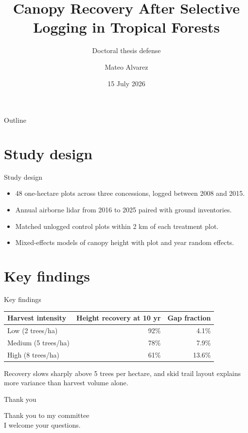 \documentclass[aspectratio=169]{beamer}
\title[Canopy Recovery]{Canopy Recovery After Selective Logging in Tropical Forests}
\subtitle{Doctoral thesis defense}
\author[M. Alvarez]{Mateo Alvarez}
\institute[Halden U.]{Department of Forest Ecology\\Halden University}
\date{15 July 2026}
\begin{document}
\begin{frame}
  \titlepage
\end{frame}

\begin{frame}{Outline}
  \tableofcontents
\end{frame}

\section{Study design}

\begin{frame}{Study design}
  \begin{itemize}
    \item 48 one-hectare plots across three concessions, logged between 2008 and 2015.
    \item Annual airborne lidar from 2016 to 2025 paired with ground inventories.
    \item Matched unlogged control plots within 2 km of each treatment plot.
    \item Mixed-effects models of canopy height with plot and year random effects.
  \end{itemize}
\end{frame}

\section{Key findings}

\begin{frame}{Key findings}
  \begin{table}
    \centering
    \begin{tabular}{lrr}
      \toprule
      Harvest intensity & Height recovery at 10 yr & Gap fraction \\
      \midrule
      Low (2 trees/ha) & 92\% & 4.1\% \\
      Medium (5 trees/ha) & 78\% & 7.9\% \\
      High (8 trees/ha) & 61\% & 13.6\% \\
      \bottomrule
    \end{tabular}
  \end{table}
  \vspace{0.5em}
  Recovery slows sharply above 5 trees per hectare, and skid trail layout
  explains more variance than harvest volume alone.
\end{frame}

\begin{frame}{Thank you}
  \begin{center}
    {\Large Thank you to my committee}\\[1em]
    I welcome your questions.
  \end{center}
\end{frame}
\end{document}
